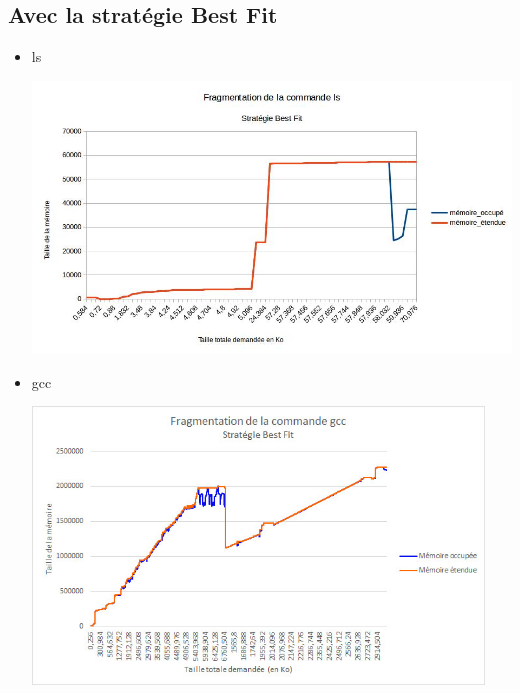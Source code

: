 \documentclass{article}
\begin{document}
\subsection{Avec la stratégie Best Fit}
\begin{itemize}
	\item ls
	
\begin{center}	
\includegraphics[width=15cm]{ls_bestfit.jpg}
\end{center}
	\item gcc

\begin{center}	
\includegraphics[width=12cm]{gcc_bestfit.jpg}
\end{center}
\end{itemize}
\end{document}
